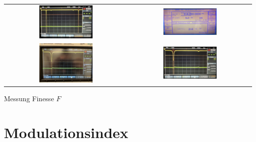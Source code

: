 \begin{center}
    \captionsetup{type=figure}
    \begin{tabular}{c c}
        \includegraphics[width=0.45\textwidth]{Bilder/Finess/finess_fsr_oszi.jpg} & \includegraphics[width=0.45\textwidth]{Bilder/Finess/finess_hf-generator.jpg}\\
        \includegraphics[width=0.45\textwidth]{Bilder/Finess/finess_max_oszi.jpg} & \includegraphics[width=0.45\textwidth]{Bilder/Finess/finess_hb_oszi.jpg}\\
    \end{tabular}
    \caption{Messung Finesse $F$}
    \label{fig:finess}
\end{center}

\newpage
\section{Modulationsindex}
\label{sec:mindex}

